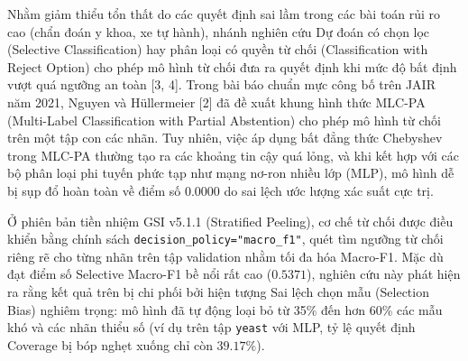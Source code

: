 \documentclass[10pt,a4paper,twoside]{article}
\begin{document}
Nhằm giảm thiểu tổn thất do các quyết định sai lầm trong các bài toán rủi ro cao (chẩn đoán y khoa, xe tự hành), nhánh nghiên cứu Dự đoán có chọn lọc (Selective Classification) hay phân loại có quyền từ chối (Classification with Reject Option) cho phép mô hình từ chối đưa ra quyết định khi mức độ bất định vượt quá ngưỡng an toàn [3, 4]. Trong bài báo chuẩn mực công bố trên JAIR năm 2021, Nguyen và Hüllermeier [2] đã đề xuất khung hình thức MLC-PA (Multi-Label Classification with Partial Abstention) cho phép mô hình từ chối trên một tập con các nhãn. Tuy nhiên, việc áp dụng bất đẳng thức Chebyshev trong MLC-PA thường tạo ra các khoảng tin cậy quá lỏng, và khi kết hợp với các bộ phân loại phi tuyến phức tạp như mạng nơ-ron nhiều lớp (MLP), mô hình dễ bị sụp đổ hoàn toàn về điểm số $0.0000$ do sai lệch ước lượng xác suất cực trị.

Ở phiên bản tiền nhiệm GSI v5.1.1 (Stratified Peeling), cơ chế từ chối được điều khiển bằng chính sách \texttt{decision\_policy="macro\_f1"}, quét tìm ngưỡng từ chối riêng rẽ cho từng nhãn trên tập validation nhằm tối đa hóa Macro-F1. Mặc dù đạt điểm số Selective Macro-F1 bề nổi rất cao ($0.5371$), nghiên cứu này phát hiện ra rằng kết quả trên bị chi phối bởi hiện tượng Sai lệch chọn mẫu (Selection Bias) nghiêm trọng: mô hình đã tự động loại bỏ từ 35\% đến hơn 60\% các mẫu khó và các nhãn thiểu số (ví dụ trên tập \texttt{yeast} với MLP, tỷ lệ quyết định Coverage bị bóp nghẹt xuống chỉ còn $39.17\%$).
\end{document}
